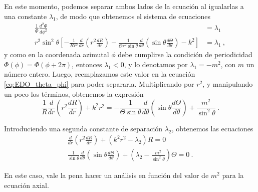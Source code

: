 En este momento, podemos separar ambos lados de la ecuación al igualarlas a una constante $\lambda_1$, de modo que obtenemos el sistema de ecuaciones
\begin{align}
    \frac{1}{\Phi} \frac{d^2\Phi}{d\phi^2} & = \lambda_1 \\
    r^2\sin^2\theta \left[ -\frac{1}{Rr^2} \frac{d}{dr}\left( r^2 \frac{dR}{dr} \right) - \frac{1}{\Theta r^2\sin\theta} \frac{d}{d\theta} \left( \sin\theta \frac{d\Theta}{d\theta} \right) - k^2 \right] & = \lambda_1 \ , \label{eq:EDO_theta_phi}
\end{align}
y como en la coordenada azimutal $\phi$ debe cumplirse la condición de periodicidad $\Phi(\phi) = \Phi(\phi + 2\pi)$, entonces $\lambda_1<0$, y lo denotamos por $\lambda_1 = -m^2$, con $m$ un número entero. Luego, reemplazamos este valor en la ecuación \eqref{eq:EDO_theta_phi} para poder separarla. Multiplicando por $r^2$, y manipulando un poco los términos, obtenemos la expresión
\begin{equation}
    \frac{1}{R} \frac{d}{dr}\left( r^2 \frac{dR}{dr} \right) + k^2r^2 = - \frac{1}{\Theta\sin\theta} \frac{d}{d\theta}\left( \sin\theta \frac{d\Theta}{d\theta}\right) + \frac{m^2}{\sin^2\theta} \ .
\end{equation}

Introduciendo una segunda constante de separación $\lambda_2$, obtenemos las ecuaciones
\begin{align}
    \frac{d}{dr}\left( r^2 \frac{dR}{dr} \right) + (k^2r^2 - \lambda_2) R = 0 \\
    \frac{1}{\sin\theta} \frac{d}{d\theta}\left( \sin\theta \frac{d\Theta}{d\theta} \right) + \left( \lambda_2 - \frac{m^2}{\sin^2\theta} \right)\Theta = 0 \ .
\end{align}

En este caso, vale la pena hacer un análisis en función del valor de $m^2$ para la ecuación axial.

